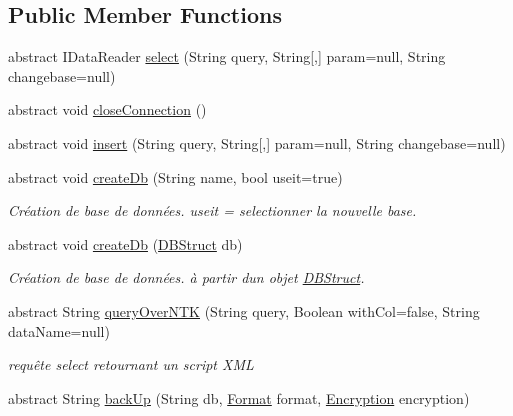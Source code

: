 \subsection*{Public Member Functions}
\begin{DoxyCompactItemize}
\item 
abstract I\+Data\+Reader \mbox{\hyperlink{class_n_t_k_1_1_database_1_1_n_t_k_database_a51c11b2072ab7cd4495d3ce8ff30916c}{select}} (String query, String\mbox{[},\mbox{]} param=null, String changebase=null)
\item 
abstract void \mbox{\hyperlink{class_n_t_k_1_1_database_1_1_n_t_k_database_a0c7312d31c1a7df56e7a70ae72c08d89}{close\+Connection}} ()
\item 
abstract void \mbox{\hyperlink{class_n_t_k_1_1_database_1_1_n_t_k_database_a18fb08c8b07a2ae45ae31c2b75ed90f0}{insert}} (String query, String\mbox{[},\mbox{]} param=null, String changebase=null)
\item 
abstract void \mbox{\hyperlink{class_n_t_k_1_1_database_1_1_n_t_k_database_a53512203df942f293f26f78ed0613fad}{create\+Db}} (String name, bool useit=true)
\begin{DoxyCompactList}\small\item\em Création de base de données. useit = selectionner la nouvelle base. \end{DoxyCompactList}\item 
abstract void \mbox{\hyperlink{class_n_t_k_1_1_database_1_1_n_t_k_database_a2e419744189f678f5cdad1f7a82116cd}{create\+Db}} (\mbox{\hyperlink{class_n_t_k_1_1_database_1_1_d_b_struct}{D\+B\+Struct}} db)
\begin{DoxyCompactList}\small\item\em Création de base de données. à partir d\textquotesingle{}un objet \mbox{\hyperlink{class_n_t_k_1_1_database_1_1_d_b_struct}{D\+B\+Struct}}. \end{DoxyCompactList}\item 
abstract String \mbox{\hyperlink{class_n_t_k_1_1_database_1_1_n_t_k_database_a86f17dcd0fe2f8f257746d8c96b125c3}{query\+Over\+N\+TK}} (String query, Boolean with\+Col=false, String data\+Name=null)
\begin{DoxyCompactList}\small\item\em requête select retournant un script X\+ML \end{DoxyCompactList}\item 
abstract String \mbox{\hyperlink{class_n_t_k_1_1_database_1_1_n_t_k_database_ab43cae272b1c57b8819d73e182dd8dca}{back\+Up}} (String db, \mbox{\hyperlink{namespace_n_t_k_1_1_database_a9bed700210ca4ed5854002637b664789}{Format}} format, \mbox{\hyperlink{namespace_n_t_k_1_1_database_aa21afe93187a6c77c4ccdc988b3c4ac2}{Encryption}} encryption)

\end{DoxyCompactItemize}

